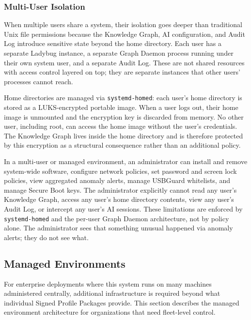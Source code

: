 \subsubsection{Multi-User Isolation}
\label{sec:multiuser}

When multiple users share a system, their isolation goes deeper than
traditional Unix file permissions because the Knowledge Graph, AI
configuration, and Audit Log introduce sensitive state beyond the home
directory. Each user has a separate Ladybug instance, a separate Graph Daemon
process running under their own system user, and a separate Audit Log. These
are not shared resources with access control layered on top; they are
separate instances that other users' processes cannot reach.

Home directories are managed via \texttt{systemd-homed}: each user's home
directory is stored as a LUKS-encrypted portable image. When a user logs out,
their home image is unmounted and the encryption key is discarded from memory.
No other user, including root, can access the home image without the user's
credentials. The Knowledge Graph lives inside the home directory and is
therefore protected by this encryption as a structural consequence rather than
an additional policy.

In a multi-user or managed environment, an administrator can install and remove
system-wide software, configure network policies, set password and screen lock
policies, view aggregated anomaly alerts, manage USBGuard whitelists, and
manage Secure Boot keys. The administrator explicitly cannot read any user's
Knowledge Graph, access any user's home directory contents, view any user's
Audit Log, or intercept any user's AI sessions. These limitations are enforced
by \texttt{systemd-homed} and the per-user Graph Daemon architecture, not by
policy alone. The administrator sees that something unusual happened via
anomaly alerts; they do not see what.

\subsection{Managed Environments}
\label{sec:managed}

For enterprise deployments where this system runs on many machines administered
centrally, additional infrastructure is required beyond what individual Signed
Profile Packages provide. This section describes the managed environment
architecture for organizations that need fleet-level control.

